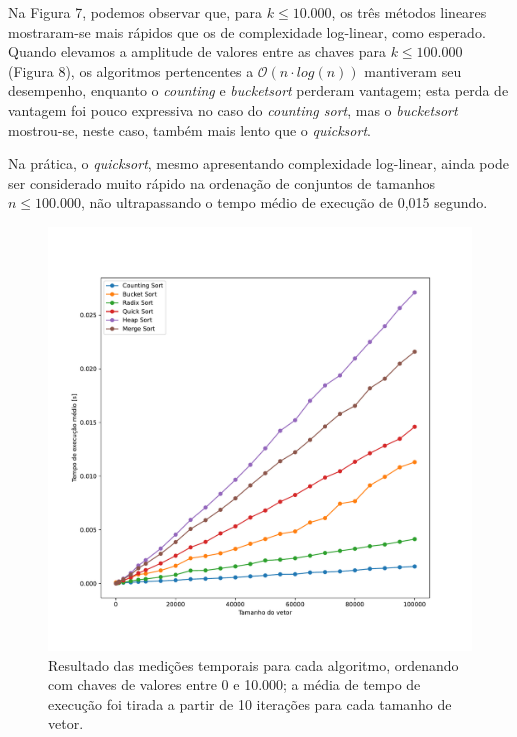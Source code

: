 \documentclass[fontsize=10pt]{article}
\begin{document}
\quad Na Figura 7, podemos observar que, para $k \leq 10.000$, os três métodos lineares mostraram-se mais rápidos que os de complexidade log-linear, como esperado. Quando elevamos a amplitude de valores entre as chaves para $k \leq 100.000$ (Figura 8), os algoritmos pertencentes a $\mathcal{O}(n \cdot log(n))$ mantiveram seu desempenho, enquanto o \textit{counting} e \textit{bucketsort} perderam vantagem; esta perda de vantagem foi pouco expressiva no caso do \textit{counting sort}, mas o \textit{bucketsort} mostrou-se, neste caso, também mais lento que o \textit{quicksort}.

\quad Na prática, o \textit{quicksort}, mesmo apresentando complexidade log-linear, ainda pode ser considerado muito rápido na ordenação de conjuntos de tamanhos $n \leq 100.000$, não ultrapassando o tempo médio de execução de 0,015 segundo.

\begin{figure}[]
\begin{center}
    \includegraphics[scale=0.4]{imagens/0101.pdf}
    \caption{Resultado das medições temporais para cada algoritmo, ordenando com chaves de valores entre 0 e 10.000; a média de tempo de execução foi tirada a partir de 10 iterações para cada tamanho de vetor.}
    \label{Figura 7}
\end{center}
\end{figure}
\end{document}
